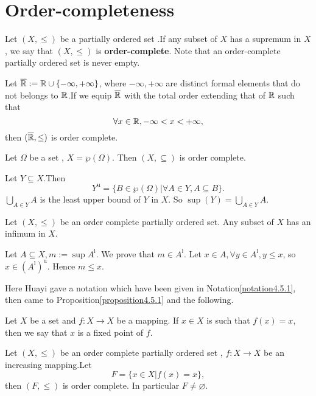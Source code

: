 \documentclass{book}
\numberwithin{equation}{section}
\begin{document}
\section{Order-completeness}
\begin{definitionenv}
    Let $(X, \le)$ be a partially ordered set .If any subset of $X$ has a supremum in $X$,  we say that  $(X,  \le)$ is \textbf{order-complete}. Note that an order-complete
partially ordered set is never empty.
\end{definitionenv}
\begin{axiomenv}
    Let $\overline{\mathbb{R}}:=\mathbb{R}\cup\{-\infty, +\infty\}$,  where $-\infty, +\infty$ are distinct formal elements that do not belongs to $\mathbb{R}$.If we equip $\overline{\mathbb{R}}$ with the total order extending that of $\mathbb{R}$ such that 
    $$\forall x\in \mathbb{R}, -\infty<x<+\infty, $$ 
    then $(\overline{\mathbb{R}}, \le)$ is order complete.
\end{axiomenv}
\begin{exampleenv}
    Let $\Omega$ be a set , $X=\wp(\Omega)$. Then $(X, \subseteq)$ is  order complete.
\end{exampleenv}
    \begin{proofenv}
        Let $Y\subseteq X$.Then 
        $$Y^{\mathrm{u}}=\{B\in\wp(\Omega)|\forall A\in Y, A\subseteq B\}.$$
        $\displaystyle \bigcup_{A\in Y}A$ is the least upper bound of $Y$ in $X$. So $\sup (Y)=\bigcup_{A\in Y}A$.
    \end{proofenv}
\begin{propositionenv}
    Let $(X, \le)$ be an order complete partially ordered set. Any subset of $X$ has an infimum in $X$.
\end{propositionenv}
\begin{proofenv}
    Let $A\subseteq X, m:=\sup A^\mathrm{l}$. We prove that $m\in A^\mathrm{l}$.
    \newline
    Let $x\in A, \forall y \in A^\mathrm{l}, y\le x $,  so $x\in (A^\mathrm{l})^\mathrm{u}$. Hence $m\le x$.
\end{proofenv}
Here Huayi gave a notation which have been given in Notation\ref{notation4.5.1}, then came to Proposition\ref{proposition4.5.1} and the following.
\begin{definitionenv}
    Let $X$ be a set and $f:X\rightarrow X$ be a mapping. If $x\in X $ is such that $f(x)=x$,  then we say that $x$ is a fixed point of $f$. 
\end{definitionenv}
\begin{theoremenv}
    \quad
    \newline
    Let $(X, \le)$ be an order complete partially ordered set , $f:X\rightarrow X$ be an increasing mapping.Let 
    $$F=\{x\in X|f(x)=x\}, $$
    then $(F, \le)$ is order complete. In particular $F\not=\varnothing$.
    
\end{theoremenv}
\end{document}
